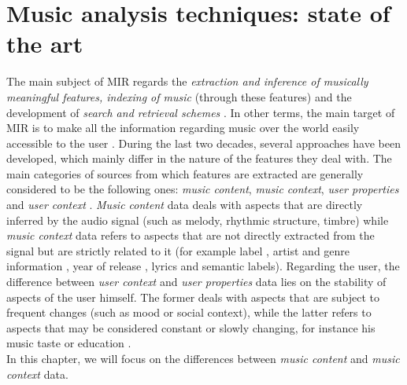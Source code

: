 \chapter{Music analysis techniques: state of the art} 
\label{Chapter2} 

The main subject of MIR regards the \textit{extraction and inference of musically meaningful features, indexing of music} (through these features) and the development of \textit{search and retrieval schemes} \cite{downieMIR}. In other terms, the main target of MIR is to make all the information regarding music over the world easily accessible to the user \cite{downieMIR}. During the last two decades, several approaches have been developed, which mainly differ in the nature of the features they deal with. The main categories of sources from which features are extracted are generally considered to be the following ones: \textit{music content}, \textit{music context}, \textit{user properties} and \textit{user context} \cite{gomez14}. \textit{Music content} data deals with aspects that are directly inferred by the audio signal (such as melody, rhythmic structure, timbre) while \textit{music context} data refers to aspects that are not directly extracted from the signal but are strictly related to it (for example label \cite{pachet00}, artist and genre information \cite{perfe11} \cite{aizenberg12}, year of release \cite{vangulik05}, lyrics \cite{coelho13} and semantic labels). Regarding the user, the difference between \textit{user context} and \textit{user properties} data lies on the stability of aspects of the user himself. The former deals with aspects that are subject to frequent changes (such as mood or social context), while the latter refers to aspects that may be considered constant or slowly changing, for instance his music taste or education \cite{gomez14}. \\In this chapter, we will focus on the differences between \textit{music content} and \textit{music context} data. 



